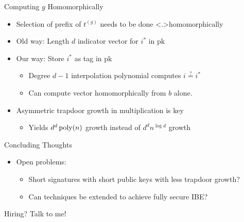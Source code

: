 \documentclass[shadow,xcolor=pdftex,svgnames,table,t]{beamer}
\begin{document}
\begin{frame}[label=compg]{Computing $g$ Homomorphically}
\begin{itemize}
\item<+-> Selection of prefix of $t^{(g)}$ needs to be done
  \alert<.>{homomorphically}
\smallskip
\item<+-> Old way: {\citationsize [DM14]} Length $d$ indicator vector
  for $i^*$ in pk
\smallskip
\item<+-> Our way: Store $i^*$ as tag in pk
\smallskip
\begin{itemize}
\item<+-> Degree $d-1$ interpolation polynomial computes
  $i\overset{?}{=}i^*$ 
\smallskip 
\item<+-> Can compute vector
  homomorphically from $b$ alone.
\smallskip
\end{itemize}
\item<+-> Asymmetric trapdoor growth in multiplication is key
\begin{itemize}
\smallskip
\item<+-> Yields $d^d\operatorname{poly}(n)$ growth instead of $d^dn^{\log{d}}$ growth
\end{itemize}
\end{itemize}
\end{frame}
\begin{frame}[label=conclusions]{Concluding Thoughts}
  \begin{itemize}
  \item<+-> Open problems:
\begin{itemize}
  \item<+-> Short signatures with short public keys with less trapdoor
    growth?
\smallskip
  \item<+-> Can techniques be extended to achieve fully secure IBE?
  \end{itemize}
\end{itemize}
  \bigskip
  \onslide<+->
  \begin{center}
    {\Large Hiring? Talk to me!}
  \end{center}
  
\end{frame}
\end{document}
